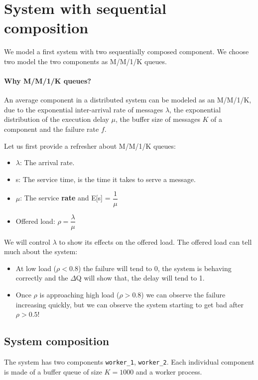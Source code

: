 \section{System with sequential composition}
    We model a first system with two sequentially composed component. We choose two model the two components as M/M/1/K queues. 
   
   \paragraph{Why M/M/1/K queues?} An average component in a distributed system can be modeled as an M/M/1/K, due to the exponential inter-arrival rate of messages $\lambda$, the exponential distribution of the execution delay $\mu$, the buffer size of messages $K$ of a component and the failure rate $f$. \cite{dq-tut}
    
    Let us first provide a refresher about M/M/1/K queues:
    \begin{itemize}
        \item $\lambda$: The arrival rate.
        \item s: The service time, is the time it takes to serve a message.
        \item $\mu$: The service \textbf{rate} and E[s] = $\dfrac{1}{\mu}$
        \item Offered load: $\rho = \dfrac{\lambda}{\mu}$
    \end{itemize}

    We will control $\lambda$ to show its effects on the offered load. The offered load can tell much about the system:
    \begin{itemize}
        \item At low load ($\rho < 0.8$) the failure will tend to 0, the system is behaving correctly and the $\Delta$Q will show that, the delay will tend to 1.
        \item Once $\rho$ is approaching high load ($\rho > 0.8$) we can observe the failure increasing quickly, but we can observe the system starting to get bad after $\rho > 0.5$! \cite{dq-tut}
    \end{itemize}
    
    \subsection{System composition}
    The system has two components \texttt{worker\_1}, \texttt{worker\_2}. Each individual component is made of a buffer queue of size $K = 1000$ and a worker process.
    
